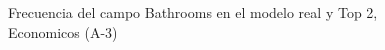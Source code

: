 \begin{figure}[H]
    \centering
    
    \caption{Frecuencia del campo Bathrooms en el modelo real y Top 2, Economicos (A-3)}
    \label{frecuency-Bathrooms-top2}
\end{figure}